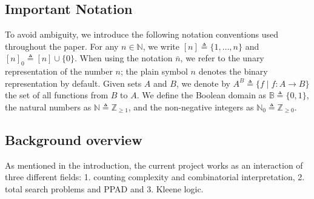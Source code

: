 

%
%
%
\subsection{Important Notation}

To avoid ambiguity, we introduce the following notation conventions used throughout the paper.
For any $n \in \mathbb{N}$, we write $[n] \triangleq \{1, \ldots, n\}$  and $[n]_0 \triangleq [n] \cup \{0\}$. 
When using the notation $\bar{n}$, we refer to the unary representation of the number $n$; the plain symbol $n$
denotes the binary representation by default.
Given sets $A$ and $B$, we denote by $A^B \triangleq \{ f \mid f : A \to B \}$
the set of all functions from $B$ to $A$.
We define the Boolean domain as $\mathbb{B} \triangleq \{0, 1\}$,
the natural numbers as $\mathbb{N} \triangleq \mathbb{Z}_{\geq 1}$,
and the non-negative integers as $\mathbb{N}_0 \triangleq \mathbb{Z}_{\geq 0}$.


\subsection{Background overview}
As mentioned in the introduction, the current project works as an interaction
of three different fields: 1. counting complexity and combinatorial interpretation, 
2. total search problems and PPAD and 3. Kleene logic.


